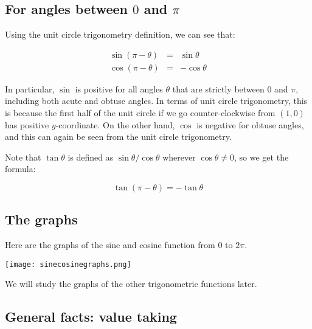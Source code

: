 \documentclass{amsart}
\begin{document}
\subsection{For angles between $0$ and $\pi$}

Using the unit circle trigonometry definition, we can see that:

\begin{eqnarray*}
  \sin(\pi - \theta) & = & \sin \theta\\
  \cos(\pi - \theta) & = & -\cos \theta
\end{eqnarray*}

In particular, $\sin$ is positive for all angles $\theta$ that are
strictly between $0$ and $\pi$, including both acute
and obtuse angles. In terms of unit circle trigonometry, this is
because the first half of the unit circle if we go counter-clockwise
from $(1,0)$ has positive $y$-coordinate. On the other hand, $\cos$ is
negative for obtuse angles, and this can again be seen from the unit
circle trigonometry.

Note that $\tan \theta$ is defined as $\sin \theta/\cos \theta$
wherever $\cos \theta \ne 0$, so we get the formula:

\begin{equation*}
  \tan(\pi - \theta) = -\tan \theta
\end{equation*}

\subsection{The graphs}

Here are the graphs of the sine and cosine function from $0$
to $2\pi$.

\texttt{[image: sinecosinegraphs.png]}

We will study the graphs of the other trigonometric functions later.

\subsection{General facts: value taking}
\end{document}

